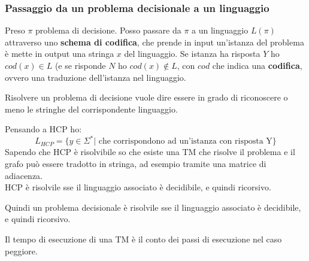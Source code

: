 \subsubsection{Passaggio da un problema decisionale a un linguaggio}
\begin{teorema}
  Preso $\pi$ problema di decisione. Posso passare da $\pi$ a un linguaggio
  $L(\pi)$ attraverso uno \textbf{schema di codifica}, che prende in input
  un'istanza del problema è mette in output una stringa $x$ del linguaggio. Se
  istanza ha risposta $Y$ ho $cod(x)\in L$ (e se risponde $N$ ho $cod(x)\not\in
  L$, con $cod$ che indica una 
  \textbf{codifica}, ovvero una traduzione dell'istanza nel linguaggio.\\
\end{teorema}
Risolvere un problema di decisione vuole dire essere in grado di riconoscere o
meno le stringhe del corrispondente linguaggio.
\begin{esempio}
  Pensando a HCP ho:
  \[L_{HCP}=\{y\in \Sigma^*|\mbox{ che corrispondono ad un'istanza con risposta
      Y}\}\]
  Sapendo che HCP è risolvibile so che esiste una TM che risolve il problema e
  il grafo può essere tradotto in stringa, ad esempio tramite una matrice di
  adiacenza.\\
  HCP è risolvile sse il linguaggio associato è decidibile, e quindi ricorsivo.
\end{esempio}
\begin{teorema}
  Quindi un problema decisionale è risolvile sse il linguaggio associato è
  decidibile, e quindi ricorsivo.
\end{teorema}
\begin{definizione}
  Il tempo di esecuzione di una TM è il conto dei passi di esecuzione nel caso
  peggiore.
\end{definizione}
\newpage
